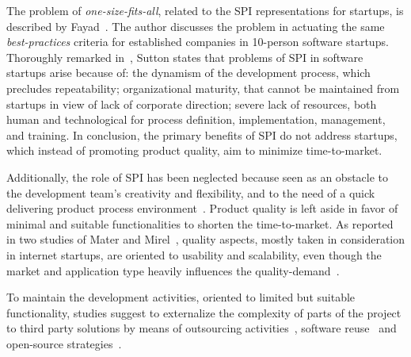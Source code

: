 \documentclass[10pt,journal,letterpaper,compsoc]{IEEEtran}
\begin{document}
The problem of \textit{one-size-fits-all}, related to the SPI representations
for startups, is described by Fayad~\cite{Fayad1997}. The author discusses the
problem in actuating the same \textit{best-practices} criteria for established
companies in 10-person software startups. Thoroughly remarked 
in~\cite{Sutton2000}, Sutton states that problems of SPI in software startups 
arise because of: the dynamism of the development process, which precludes
repeatability; organizational maturity, that cannot be maintained from startups
in view of lack of corporate direction; severe lack of resources, both human and
technological for process definition, implementation, management, and training.
In conclusion, the primary benefits of SPI do not address startups, which
instead of promoting product quality, aim to minimize time-to-market.

Additionally, the role of SPI has been neglected because seen as an obstacle to
the development team's creativity and flexibility, and to the need of a quick
delivering product process environment~\cite{Coleman2008a}. 
Product quality is left aside in favor of minimal and suitable functionalities 
to shorten the time-to-market. As reported in two studies of Mater and 
Mirel~\cite{Mater2000, Mirel2000}, quality aspects, mostly taken in 
consideration in internet startups, are oriented to usability and scalability, 
even though the market and application type heavily influences the 
quality-demand~\cite{Coleman2008, Kim2005}.

To maintain the development activities, oriented to limited but suitable
functionality, studies suggest to externalize the complexity of parts of the
project to third party solutions by means of outsourcing 
activities~\cite{Hanna2010}, software reuse~\cite{Jansen2008} and open-source 
strategies~\cite{Wall2001, Bean2005}. %

\end{document}
